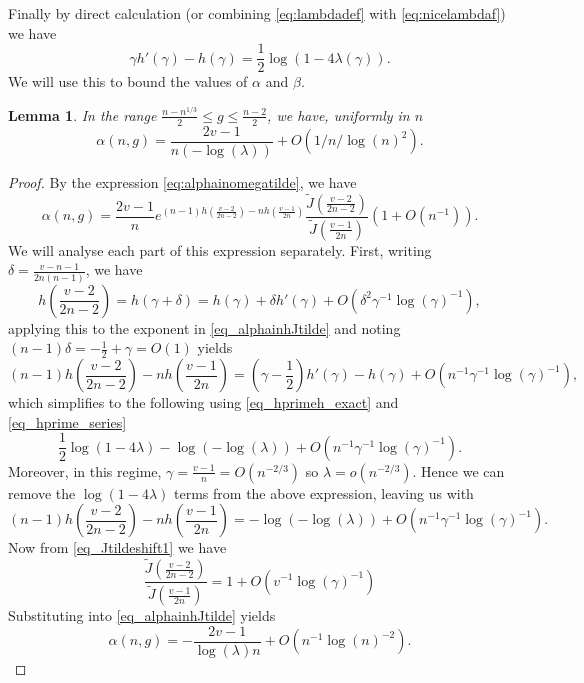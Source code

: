 \documentclass[a4paper,12pt]{article}
\newtheorem{lemma}[theorem]{Lemma}
\theoremstyle{definition}
\newcommand{\bigO}[1]{O\left({#1}\right)}
\begin{document}
Finally by direct calculation (or combining \eqref{eq:lambdadef} with \eqref{eq:nicelambdaf}) we have
\begin{equation}\gamma h'(\gamma)-h(\gamma)=\frac{1}{2}\log(1-4\lambda(\gamma)).\label{eq_hprimeh_exact}\end{equation}
We will use this to bound the values of $\alpha$ and $\beta$.
\begin{lemma}\label{lem_alpha_high}
In the range $\frac{n-n^{1/3}}{2}\leq g \leq \frac{n-2}{2}$, we have, uniformly in $n$
    \[\alpha(n,g)=\frac{2v-1}{n(-\log(\lambda))}+O(1/n/\log(n)^2).\]
\end{lemma}
\begin{proof}
By the expression \eqref{eq:alphainomegatilde}, we have
\begin{equation}\label{eq_alphainhJtilde}\alpha(n,g)=\frac{2v-1}{n}e^{(n-1)h(\frac{v-2}{2n-2})-nh(\frac{v-1}{2n})}\frac{\tilde{J}(\frac{v-2}{2n-2})}{\tilde{J}(\frac{v-1}{2n})}(1+O(n^{-1})).\end{equation}
We will analyse each part of this expression separately. First, writing $\delta=\frac{v-n-1}{2n(n-1)}$, we have
\[h\left(\frac{v-2}{2n-2}\right)=h(\gamma+\delta)=h(\gamma)+\delta h'(\gamma)+O(\delta^{2}\gamma^{-1}\log(\gamma)^{-1}),\]
applying this to the exponent in \eqref{eq_alphainhJtilde} and noting $(n-1)\delta=-\frac{1}{2}+\gamma=\bigO{1}$ yields
\[(n-1)h\left(\frac{v-2}{2n-2}\right)-nh\left(\frac{v-1}{2n}\right)%
=\left(\gamma-\frac{1}{2}\right) h'(\gamma)-h\left(\gamma\right)+O(n^{-1}\gamma^{-1}\log(\gamma)^{-1}),\]
which simplifies to the following using \eqref{eq_hprimeh_exact} and \eqref{eq_hprime_series}
\[\frac{1}{2}\log(1-4\lambda)-\log(-\log(\lambda))+O(n^{-1}\gamma^{-1}\log(\gamma)^{-1}).\]
Moreover, in this regime, $\gamma=\frac{v-1}{n}=O(n^{-2/3})$ so $\lambda=o(n^{-2/3})$. Hence we can remove the $\log(1-4\lambda)$ terms from the above expression, leaving us with
\[(n-1)h\left(\frac{v-2}{2n-2}\right)-nh\left(\frac{v-1}{2n}\right)=-\log(-\log(\lambda))+O(n^{-1}\gamma^{-1}\log(\gamma)^{-1})
.\]
Now from \eqref{eq_Jtildeshift1} we have
\[\frac{\tilde{J}(\frac{v-2}{2n-2})}{\tilde{J}(\frac{v-1}{2n})}=1+\bigO{v^{-1}\log(\gamma)^{-1}}\]
Substituting into \eqref{eq_alphainhJtilde} yields
\[\alpha(n,g)=-\frac{2v-1}{\log(\lambda)n}+\bigO{n^{-1}\log(n)^{-2}}.\]
\end{proof}
\end{document}
